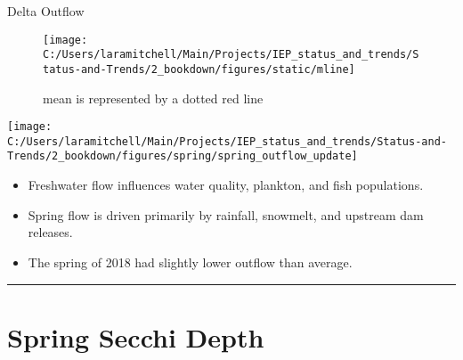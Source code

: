 \documentclass[
]{book}
\providecommand{\tightlist}{%
  \setlength{\itemsep}{0pt}\setlength{\parskip}{0pt}}
\begin{document}
Delta Outflow

\begin{figure}
\texttt{[image: C:/Users/laramitchell/Main/Projects/IEP\_status\_and\_trends/Status-and-Trends/2\_bookdown/figures/static/mline]} \caption{mean is represented by a dotted red line}\label{fig:unnamed-chunk-4}
\end{figure}

\texttt{[image: C:/Users/laramitchell/Main/Projects/IEP\_status\_and\_trends/Status-and-Trends/2\_bookdown/figures/spring/spring\_outflow\_update]}

\begin{itemize}
\tightlist
\item
  Freshwater flow influences water quality, plankton, and fish populations.
\item
  Spring flow is driven primarily by rainfall, snowmelt, and upstream dam releases.
\item
  The spring of 2018 had slightly lower outflow than average.
\end{itemize}

\begin{center}\rule{0.5\linewidth}{0.5pt}\end{center}

\hypertarget{spring-secchi-depth}{%
\section{Spring Secchi Depth}\label{spring-secchi-depth}}
\end{document}
